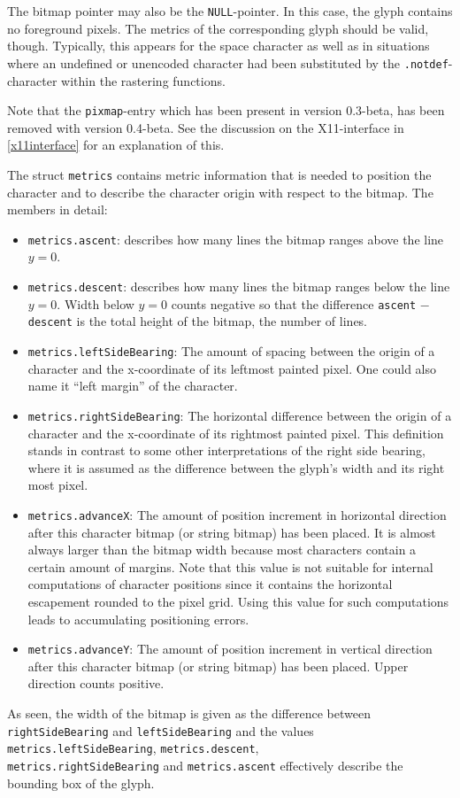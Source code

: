 The bitmap pointer may also be
the \verb+NULL+-pointer. In this case, the glyph contains no foreground
pixels. The metrics of the corresponding glyph should be valid,
though. Typically, this appears for the space character as well as in
situations where an undefined or unencoded character had been substituted by
the \verb+.notdef+-character within the rastering functions.

Note that the \verb+pixmap+-entry which has been present in version 0.3-beta,
has been removed with version 0.4-beta. See the discussion on the X11-interface
in \ref{x11interface} for an explanation of this.

The struct \verb+metrics+ contains metric information that is needed
to position the character and to describe the character origin
with respect to the bitmap. The members in detail:
\begin{itemize}
\item \verb+metrics.ascent+: describes how many lines the bitmap
  ranges above the line $y=0$. 
\item \verb+metrics.descent+: describes how many lines the bitmap
  ranges below the line $y=0$. Width below $y=0$ counts negative so that the
  difference \verb+ascent+ $-$ \verb+descent+ is the
  total height of the bitmap, the number of lines.
\item \verb+metrics.leftSideBearing+: The amount of spacing between
  the origin of a character and the x-coordinate of its leftmost
  painted pixel. One could also name it ``left margin'' of the
  character. 
\item \verb+metrics.rightSideBearing+: The horizontal difference between
  the origin of a character and the x-coordinate of its rightmost
  painted pixel. This definition stands in contrast to some other
  interpretations of the right side bearing, where it is assumed as the
  difference between the glyph's width and its right most pixel.
\item \verb+metrics.advanceX+: The amount of position increment in
  horizontal direction after this character
  bitmap (or string bitmap) has been placed. It is almost always
  larger than the bitmap width because most characters contain a
  certain amount of margins. Note that this value is not suitable for internal
  computations of character positions since it contains the horizontal
  escapement rounded to the pixel grid. Using this value for such computations
  leads to accumulating positioning errors.
\item \verb+metrics.advanceY+: The amount of position increment in
  vertical direction after this character
  bitmap (or string bitmap) has been placed. Upper direction counts positive. 
\end{itemize}
As seen, the width of the bitmap is given as the difference between
\verb+rightSideBearing+ and \verb+leftSideBearing+ and the values
\verb+metrics.leftSideBearing+, \verb+metrics.descent+,\\
\verb+metrics.rightSideBearing+ and \verb+metrics.ascent+ effectively describe
the bounding box of the glyph.

